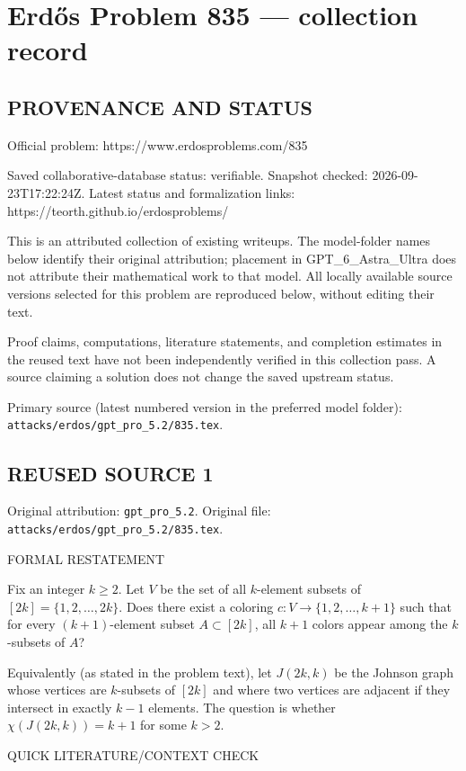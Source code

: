 \section*{Erd\H{o}s Problem 835 --- collection record}

\subsection*{PROVENANCE AND STATUS}
Official problem: https://www.erdosproblems.com/835

Saved collaborative-database status: verifiable.
Snapshot checked: 2026-09-23T17:22:24Z.
Latest status and formalization links: https://teorth.github.io/erdosproblems/

This is an attributed collection of existing writeups. The model-folder names below identify their original attribution; placement in GPT\_6\_Astra\_Ultra does not attribute their mathematical work to that model. All locally available source versions selected for this problem are reproduced below, without editing their text.

Proof claims, computations, literature statements, and completion estimates in the reused text have not been independently verified in this collection pass. A source claiming a solution does not change the saved upstream status.

Primary source (latest numbered version in the preferred model folder): \texttt{attacks/erdos/gpt\_pro\_5.2/835.tex}.

\subsection*{REUSED SOURCE 1}
Original attribution: \texttt{gpt\_pro\_5.2}.
Original file: \texttt{attacks/erdos/gpt\_pro\_5.2/835.tex}.


FORMAL RESTATEMENT

Fix an integer $k\ge 2$.
Let $V$ be the set of all $k$-element subsets of $[2k]=\{1,2,\dots,2k\}$.
Does there exist a coloring $c:V\to\{1,2,\dots,k+1\}$ such that for every $(k+1)$-element subset $A\subset[2k]$, all $k+1$ colors appear among the $k$-subsets of $A$?

Equivalently (as stated in the problem text), let $J(2k,k)$ be the Johnson graph whose vertices are $k$-subsets of $[2k]$ and where two vertices are adjacent if they intersect in exactly $k-1$ elements.
The question is whether $\chi(J(2k,k))=k+1$ for some $k>2$.

QUICK LITERATURE/CONTEXT CHECK

